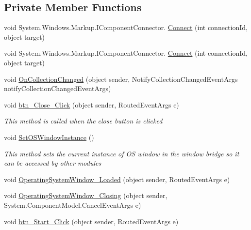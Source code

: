 \subsection*{Private Member Functions}
\begin{DoxyCompactItemize}
\item 
void System.\+Windows.\+Markup.\+I\+Component\+Connector. \hyperlink{class_c_p_u___o_s___simulator_1_1_operating_system_main_window_ad482fe0b46f681bb64b29500fa69b98b}{Connect} (int connection\+Id, object target)
\item 
void System.\+Windows.\+Markup.\+I\+Component\+Connector. \hyperlink{class_c_p_u___o_s___simulator_1_1_operating_system_main_window_ad482fe0b46f681bb64b29500fa69b98b}{Connect} (int connection\+Id, object target)
\item 
void \hyperlink{class_c_p_u___o_s___simulator_1_1_operating_system_main_window_aeda3cbb43fe602a4ba5325b0a8a9e2ee}{On\+Collection\+Changed} (object sender, Notify\+Collection\+Changed\+Event\+Args notify\+Collection\+Changed\+Event\+Args)
\item 
void \hyperlink{class_c_p_u___o_s___simulator_1_1_operating_system_main_window_a92ce496d30585ff30ac840fbeb7b8a16}{btn\+\_\+\+Close\+\_\+\+Click} (object sender, Routed\+Event\+Args e)
\begin{DoxyCompactList}\small\item\em This method is called when the close button is clicked \end{DoxyCompactList}\item 
void \hyperlink{class_c_p_u___o_s___simulator_1_1_operating_system_main_window_a0f58f20c1fe9dbc972fdf41ae871dea7}{Set\+O\+S\+Window\+Instance} ()
\begin{DoxyCompactList}\small\item\em This method sets the current instance of O\+S window in the window bridge so it can be accessed by other modules \end{DoxyCompactList}\item 
void \hyperlink{class_c_p_u___o_s___simulator_1_1_operating_system_main_window_a05b54ac7242f582757f99f3e7a6c48cf}{Operating\+System\+Window\+\_\+\+Loaded} (object sender, Routed\+Event\+Args e)
\item 
void \hyperlink{class_c_p_u___o_s___simulator_1_1_operating_system_main_window_a5e823b50dfab668d8e61d9d3ecea300c}{Operating\+System\+Window\+\_\+\+Closing} (object sender, System.\+Component\+Model.\+Cancel\+Event\+Args e)
\item 
void \hyperlink{class_c_p_u___o_s___simulator_1_1_operating_system_main_window_a49ee2facd64a57c8a3450ccd5582dfff}{btn\+\_\+\+Start\+\_\+\+Click} (object sender, Routed\+Event\+Args e)

\end{DoxyCompactItemize}

